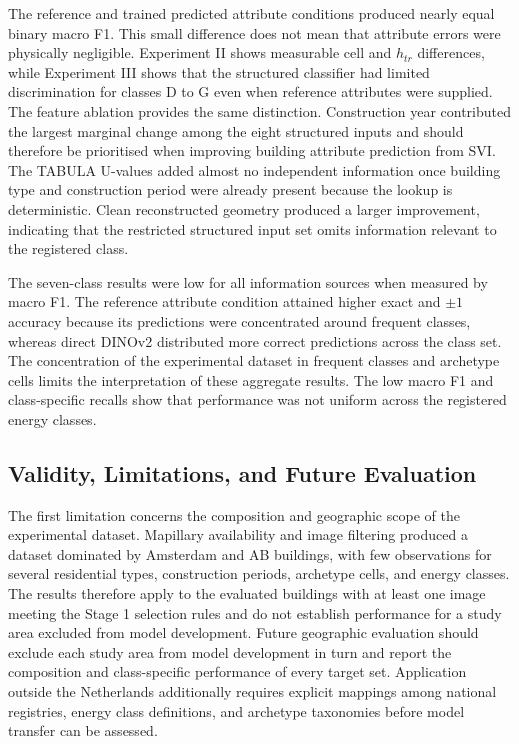 The reference and trained predicted attribute conditions produced nearly equal binary macro F1. This small difference does not mean that attribute errors were physically negligible. Experiment II shows measurable cell and $h_{tr}$ differences, while Experiment III shows that the structured classifier had limited discrimination for classes D to G even when reference attributes were supplied. The feature ablation provides the same distinction. Construction year contributed the largest marginal change among the eight structured inputs and should therefore be prioritised when improving building attribute prediction from \ac{SVI}. The TABULA U-values added almost no independent information once building type and construction period were already present because the lookup is deterministic. Clean reconstructed geometry produced a larger improvement, indicating that the restricted structured input set omits information relevant to the registered class.

The seven-class results were low for all information sources when measured by macro F1. The reference attribute condition attained higher exact and $\pm1$ accuracy because its predictions were concentrated around frequent classes, whereas direct DINOv2 distributed more correct predictions across the class set. The concentration of the experimental dataset in frequent classes and archetype cells limits the interpretation of these aggregate results. The low macro F1 and class-specific recalls show that performance was not uniform across the registered energy classes.

\subsection{Validity, Limitations, and Future Evaluation}
\label{sec:validity_limitations}

The first limitation concerns the composition and geographic scope of the experimental dataset. Mapillary availability and image filtering produced a dataset dominated by Amsterdam and AB buildings, with few observations for several residential types, construction periods, archetype cells, and energy classes. The results therefore apply to the evaluated buildings with at least one image meeting the Stage 1 selection rules and do not establish performance for a study area excluded from model development. Future geographic evaluation should exclude each study area from model development in turn and report the composition and class-specific performance of every target set. Application outside the Netherlands additionally requires explicit mappings among national registries, energy class definitions, and archetype taxonomies before model transfer can be assessed.

